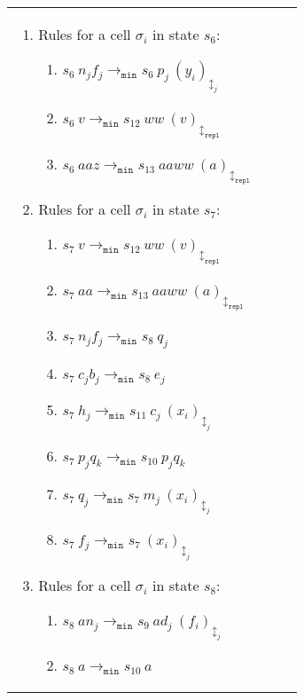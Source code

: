 \documentclass[preliminary,copyright,creativecommons]{eptcs}
\theoremstyle{remark}
\newcommand{\modmin}{\mathtt{min}}
\newcommand{\modrepl}{\mathtt{repl}}
\begin{document}
\begin{tabular}[t]{ll}
\begin{minipage}[t]{3.0in}
\begin{enumerate}
  \item Rules for a cell $\sigma_i$ in state $s_6$:
    \begin{enumerate}[1]
\item $s_6~ n_j f_j \rightarrow_{\modmin} s_6~ p_j~ (y_i)_{\updownarrow_{j}}$ 

    \item $s_6~ v \rightarrow_{\modmin} s_{12}~ w w~ (v)_{\updownarrow_{\modrepl}}$

    \item $s_6~ a a z \rightarrow_{\modmin} s_{13}~ a a w w~ (a)_{\updownarrow_{\modrepl}}$
    \end{enumerate}

  \item Rules for a cell $\sigma_i$ in state $s_7$:
    \begin{enumerate}[1]

    \item $s_7~ v \rightarrow_{\modmin} s_{12}~ w w~ (v)_{\updownarrow_\modrepl}$
    \item $s_7~ a a \rightarrow_{\modmin} s_{13}~ a a w w~ (a)_{\updownarrow_{\modrepl}}$

    \item $s_7~ n_j f_j \rightarrow_{\modmin} s_8~ q_j$
    \item $s_7~ c_j b_j \rightarrow_{\modmin} s_8~ e_j$

    \item $s_7~ h_j \rightarrow_{\modmin} s_{11}~ c_j~ (x_i)_{\updownarrow_j}$
    \item $s_7~ p_j q_k \rightarrow_{\modmin} s_{10}~ p_j q_k$

    \item $s_7~ q_j \rightarrow_{\modmin} s_7~ m_j~ (x_i)_{\updownarrow_j}$
    \item $s_7~ f_j \rightarrow_{\modmin} s_7~ (x_i)_{\updownarrow_j}$
    \end{enumerate}

  \item Rules for a cell $\sigma_i$ in state $s_8$:
    \begin{enumerate}[1]
    \item $s_8~ a n_j \rightarrow_{\modmin} s_9~ a d_j~ (f_i)_{\updownarrow_j}$

\item $s_8~ a \rightarrow_{\modmin} s_{10}~ a$ 
    \end{enumerate}

  \end{enumerate}
  \end{minipage}
&
  \begin{minipage}[t]{3.0in}
  \begin{enumerate}


\end{enumerate}
\end{minipage}
\end{tabular}
\end{document}
